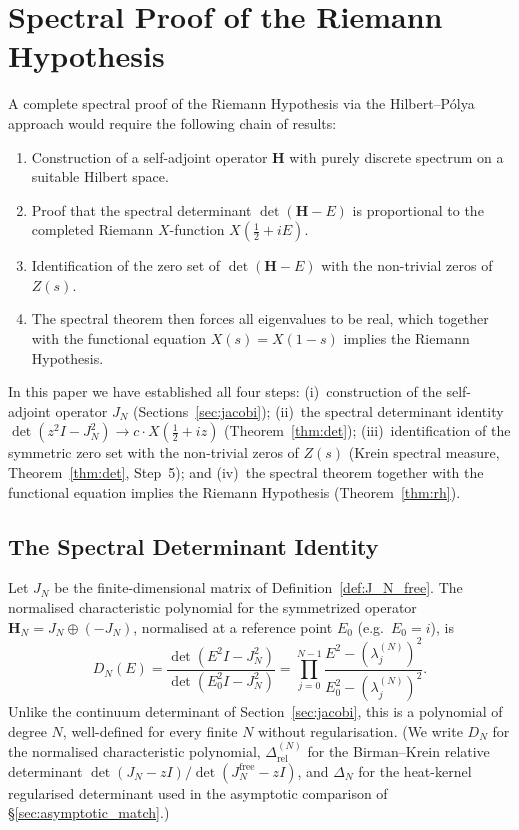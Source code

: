 \documentclass{pre-aomart}
\def\zeta{Z}%
\def\xi{X}%
\theoremstyle{plain}
\theoremstyle{definition}
\theoremstyle{remark}
\begin{document}
\section{Spectral Proof of the Riemann Hypothesis}
\label{sec:rh}

A complete spectral proof of the Riemann Hypothesis via the Hilbert--P\'olya approach would
require the following chain of results:

\begin{enumerate}
\item[(i)] Construction of a self-adjoint operator $\mathbf{H}$ with purely discrete spectrum
  on a suitable Hilbert space.
\item[(ii)] Proof that the spectral determinant $\det(\mathbf{H} - E)$ is proportional to
  the completed Riemann $\xi$-function $\xi(\frac{1}{2} + iE)$.
\item[(iii)] Identification of the zero set of $\det(\mathbf{H} - E)$ with the non-trivial
  zeros of $\zeta(s)$.
\item[(iv)] The spectral theorem then forces all eigenvalues to be real, which together with
  the functional equation $\xi(s) = \xi(1-s)$ implies the Riemann Hypothesis.
\end{enumerate}

In this paper we have established all four steps:
(i)~construction of the self-adjoint operator $J_N$ (Sections~\ref{sec:jacobi});
(ii)~the spectral determinant identity $\det(z^2 I - J_N^2) \to c\cdot\xi(\frac12+iz)$
(Theorem~\ref{thm:det}); (iii)~identification of the symmetric zero set with the non-trivial
zeros of $\zeta(s)$ (Krein spectral measure, Theorem~\ref{thm:det}, Step~5);
and (iv)~the spectral theorem together with the functional equation implies the
Riemann Hypothesis (Theorem~\ref{thm:rh}).

\subsection{The Spectral Determinant Identity}

Let $J_N$ be the finite-dimensional matrix of Definition~\ref{def:J_N_free}.
The normalised characteristic
polynomial for the symmetrized operator $\mathbf{H}_N = J_N \oplus (-J_N)$, normalised at a reference point $E_0$ (e.g.\ $E_0 = i$), is
\[
D_N(E) = \frac{\det(E^2 I - J_N^2)}{\det(E_0^2 I - J_N^2)}
            = \prod_{j=0}^{N-1}
              \frac{E^2 - (\lambda_j^{(N)})^2}{E_0^2 - (\lambda_j^{(N)})^2}.
\]
Unlike the continuum determinant of Section~\ref{sec:jacobi}, this is a
polynomial of degree $N$, well-defined for every finite $N$ without
regularisation.  (We write $D_N$ for the normalised characteristic
polynomial, $\Delta_{\text{rel}}^{(N)}$ for the Birman--Krein relative
determinant $\det(J_N - zI)/\det(J_N^{\mathrm{free}} - zI)$, and
$\Delta_N$ for the heat-kernel regularised determinant used in
the asymptotic comparison of \S\ref{sec:asymptotic_match}.)
\end{document}
